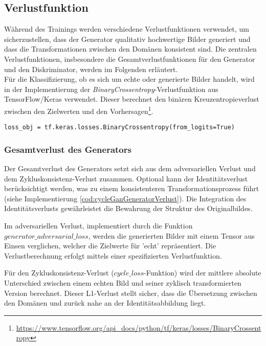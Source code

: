 \newpage
\subsection{Verlustfunktion}
Während des Trainings werden verschiedene Verlustfunktionen verwendet, um sicherzustellen, dass der Generator qualitativ hochwertige Bilder generiert und dass die Transformationen zwischen den Domänen konsistent sind. Die zentralen Verlustfunktionen, insbesondere die Gesamtverlustfunktionen für den Generator und den Diskriminator, werden im Folgenden erläutert. 
\\
Für die Klassifizierung, ob es sich um echte oder generierte Bilder handelt, wird in der Implementierung der \textit{BinaryCrossentropy}-Verlustfunktion aus TensorFlow/Keras verwendet. 
Dieser berechnet den binären Kreuzentropieverlust zwischen den Zielwerten und den Vorhersagen\footnote{\url{https://www.tensorflow.org/api_docs/python/tf/keras/losses/BinaryCrossentropy}}.

\begin{lstlisting}[language=pyhaff, caption={Initialisierung des BinaryCrossentropy-\\Verlustfunktion}, label={cod:binaryCrossentropy}]
loss_obj = tf.keras.losses.BinaryCrossentropy(from_logits=True)
\end{lstlisting}


\subsubsection{Gesamtverlust des Generators}
Der Gesamtverlust des Generators setzt sich aus dem adversariellen Verlust und dem Zykluskonsistenz-Verlust zusammen. Optional kann der Identitätsverlust berücksichtigt werden, was zu einem konsistenteren Transformationsprozess führt (siehe Implementierung \ref{cod:cycleGanGeneratorVerlust}). Die Integration des Identitätsverlusts gewährleistet die Bewahrung der Struktur des Originalbildes.

Im adversariellen Verlust, implementiert durch die Funktion \\$generator\_adversarial\_loss$, werden die generierten Bilder mit einem Tensor aus Einsen verglichen, welcher die Zielwerte für 'echt' repräsentiert. Die Verlustberechnung erfolgt mittels einer spezifizierten Verlustfunktion.

Für den Zykluskonsistenz-Verlust ($cycle\_loss$-Funktion) wird der mittlere absolute Unterschied zwischen einem echten Bild und seiner zyklisch transformierten Version berechnet. Dieser L1-Verlust stellt sicher, dass die Übersetzung zwischen den Domänen und zurück nahe an der Identitätsabbildung liegt.

